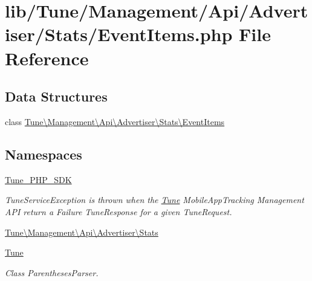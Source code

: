 \hypertarget{EventItems_8php}{\section{lib/\-Tune/\-Management/\-Api/\-Advertiser/\-Stats/\-Event\-Items.php File Reference}
\label{EventItems_8php}
}
\subsection*{Data Structures}
\begin{DoxyCompactItemize}
\item 
class \hyperlink{classTune_1_1Management_1_1Api_1_1Advertiser_1_1Stats_1_1EventItems}{Tune\textbackslash{}\-Management\textbackslash{}\-Api\textbackslash{}\-Advertiser\textbackslash{}\-Stats\textbackslash{}\-Event\-Items}
\end{DoxyCompactItemize}
\subsection*{Namespaces}
\begin{DoxyCompactItemize}
\item 
\hyperlink{namespaceTune__PHP__SDK}{Tune\-\_\-\-P\-H\-P\-\_\-\-S\-D\-K}
\begin{DoxyCompactList}\small\item\em Tune\-Service\-Exception is thrown when the \hyperlink{namespaceTune}{Tune} Mobile\-App\-Tracking Management A\-P\-I return a Failure Tune\-Response for a given Tune\-Request. \end{DoxyCompactList}\item 
\hyperlink{namespaceTune_1_1Management_1_1Api_1_1Advertiser_1_1Stats}{Tune\textbackslash{}\-Management\textbackslash{}\-Api\textbackslash{}\-Advertiser\textbackslash{}\-Stats}
\item 
\hyperlink{namespaceTune}{Tune}
\begin{DoxyCompactList}\small\item\em Class Parentheses\-Parser. \end{DoxyCompactList}\end{DoxyCompactItemize}
